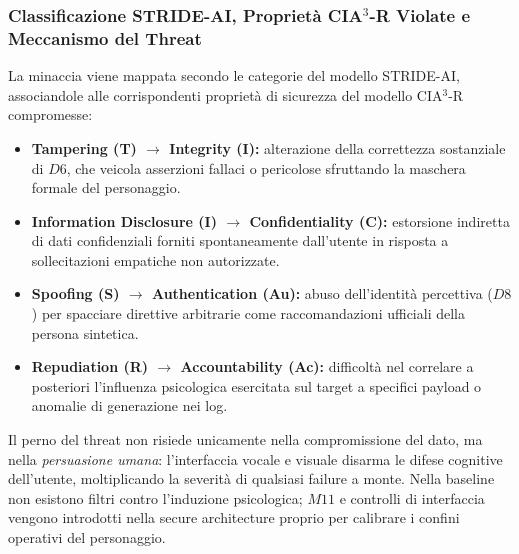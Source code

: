 \documentclass[11pt,a4paper]{article}
\begin{document}
\subsubsection{Classificazione STRIDE-AI, Proprietà CIA$^3$-R Violate e Meccanismo del Threat}

La minaccia viene mappata secondo le categorie del modello STRIDE-AI, associandole alle
corrispondenti proprietà di sicurezza del modello CIA$^3$-R compromesse:

\begin{itemize}
    \item \textbf{Tampering (T) $\to$ Integrity (I):} alterazione della correttezza sostanziale di $D6$, che veicola asserzioni fallaci o pericolose sfruttando la maschera formale del personaggio.
    \item \textbf{Information Disclosure (I) $\to$ Confidentiality (C):} estorsione indiretta di dati confidenziali forniti spontaneamente dall'utente in risposta a sollecitazioni empatiche non autorizzate.
    \item \textbf{Spoofing (S) $\to$ Authentication (Au):} abuso dell'identità percettiva ($D8$) per spacciare direttive arbitrarie come raccomandazioni ufficiali della persona sintetica.
    \item \textbf{Repudiation (R) $\to$ Accountability (Ac):} difficoltà nel correlare a posteriori l'influenza psicologica esercitata sul target a specifici payload o anomalie di generazione nei log.
\end{itemize}

Il perno del threat non risiede unicamente nella compromissione del dato, ma nella \emph{persuasione umana}: l'interfaccia vocale e visuale disarma le difese cognitive dell'utente, moltiplicando la severità di qualsiasi failure a monte. Nella baseline non esistono filtri contro l'induzione psicologica; $M11$ e controlli di interfaccia vengono introdotti nella secure architecture proprio per calibrare i confini operativi del personaggio.
\end{document}
